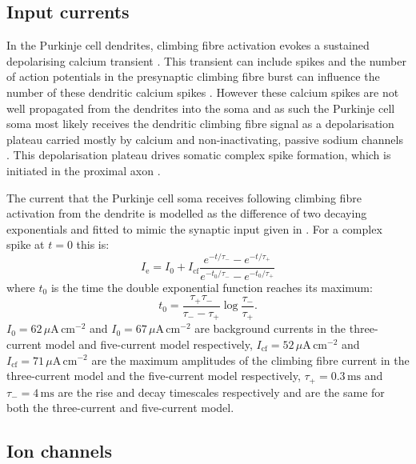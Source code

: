 \documentclass[twocolumn]{svjour3}          %
\newcommand{\mse}{\,\mathrm{ms}}
\newcommand{\cm}{\,\mathrm{cm}}
\begin{document}
\subsection{Input currents}

In the Purkinje cell dendrites, climbing fibre activation evokes a
sustained depolarising calcium transient
\citep{KitamuraHaeusser2011}. This transient can include spikes and the
number of action potentials in the presynaptic climbing fibre burst can influence
the number of these dendritic calcium spikes
\citep{LlinasSugimori1980a,KitamuraHaeusser2011,DavieEtAl2008,MathyEtAl2009}. However
these calcium spikes are not well propagated from the dendrites into
the soma \citep{DavieEtAl2008} and as such the Purkinje cell soma most
likely receives the dendritic climbing fibre signal as a
depolarisation plateau carried mostly by calcium and non-inactivating, passive sodium
channels
\citep{LlinasSugimori1980b,KnopfelEtAl1990,LlinasNicholson1971,StuartHausser1994}. This
depolarisation plateau drives somatic complex spike formation, which
is initiated in the proximal axon \citep{StuartHausser1994,DavieEtAl2008,PalmerEtAl2010}. 

The current that the Purkinje cell soma receives following climbing
fibre activation from the dendrite is modelled as the difference of
two decaying exponentials and fitted to mimic the synaptic input given in \citet{DavieEtAl2008}. For a complex spike at $t=0$ this is:
\begin{equation}
\label{eq:I_synapse}
I_{\mathrm{e}} = I_0+I_{\mathrm{cf}}\frac{e^{-t/\tau_-}-e^{-t/\tau_+}}{e^{-t_0/\tau_-}-e^{-t_0/\tau_+}}
\end{equation}
where $t_0$ is the time the double exponential function reaches its maximum:
\begin{equation}
t_0 = \frac{\tau_+\tau_-} {\tau_--\tau_+}\log{\frac{\tau_-}{\tau_+}}.
\end{equation}
$I_0=62\,\mu\mathrm{A}\cm^{-2}$ and $I_0=67\,\mu\mathrm{A}\cm^{-2}$
are background currents in the three-current model and five-current
model respectively, $I_{\mathrm{cf}}=52\,\mu\mathrm{A}\cm^{-2}$ and
$I_{\mathrm{cf}}=71\,\mu\mathrm{A}\cm^{-2}$ are the maximum amplitudes
of the climbing fibre current in the three-current model and the
five-current model respectively, $\tau_+=0.3\mse$ and $\tau_-=4\mse$
are the rise and decay timescales respectively and are the same for
both the three-current and five-current model.

\subsection{Ion channels}
\end{document}
